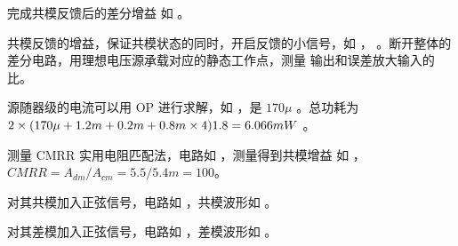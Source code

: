 \documentclass[lang=cn,11pt,a4paper,cite=authoryear]{elegantpaper}
\begin{document}
{完成共模反馈后的差分增益} 如  。


共模反馈的增益，保证共模状态的同时，开启反馈的小信号，如  ， 。断开整体的差分电路，用理想电压源承载对应的静态工作点，测量 输出和误差放大输入的比。



源随器级的电流可以用 OP 进行求解，如  ，是 \(170 \mu\) 。总功耗为 \(2 \times (170 \mu + 1.2 m + 0.2 m \time 2 + 0.8m \times 4) 1.8 = 6.066 mW\) 。


测量 CMRR 实用电阻匹配法，电路如  ，测量得到共模增益 如  ，\(CMRR = A_{dm}/A_{cm} = 5.5 / 5.4 m = 100 \)。




对其共模加入正弦信号，电路如  ，共模波形如  。





对其差模加入正弦信号，电路如  ，差模波形如  。





% 






\end{document}
